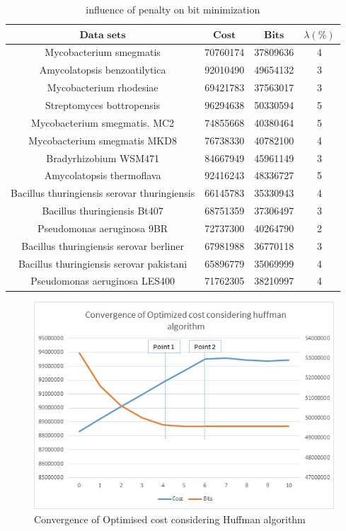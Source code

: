 \documentclass[preprint,12pt]{elsarticle}
\begin{document}
\begin{table}
\small
\label{datas}
\caption{influence of penalty on bit minimization}
\begin{center}
\begin{tabular}{c c c c }
\toprule
$\textbf{Data sets}$ & $\textbf{Cost}$	& $\textbf{Bits}$ &		\textbf{$\lambda (\%)$} \\\hline
Mycobacterium smegmatis &	 70760174 &37809636& 4\\\hline
Amycolatopsis benzoatilytica &	92010490& 49654132& 3\\\hline
Mycobacterium rhodesiae&	69421783& 37563017 &3\\\hline
Streptomyces bottropensis&	96294638& 50330594& 5\\\hline
Mycobacterium smegmatis. MC2&	74855668 &40380464& 5\\\hline
Mycobacterium smegmatis MKD8&	76738330& 40782100 &4\\\hline
Bradyrhizobium WSM471&	84667949 &45961149& 3\\\hline
Amycolatopsis thermoflava&	92416243 &48336727& 5\\\hline
Bacillus thuringiensis serovar thuringiensis&	66145783& 35330943& 4\\\hline
Bacillus thuringiensis Bt407&	68751359& 37306497 &3\\\hline
Pseudomonas aeruginosa 9BR&	72737300 &40264790& 2\\\hline
Bacillus thuringiensis serovar berliner&	67981988 &36770118 &3\\\hline
Bacillus thuringiensis serovar pakistani&	65896779& 35069999 &4\\\hline
Pseudomonas aeruginosa LES400&	71762305 &38210997 &4\\\hline
\bottomrule
\end{tabular}
\end{center}
\end{table}
\begin{figure}[h]
\begin{center}
\includegraphics{Images/Drawing4.jpg}
\caption{Convergence of Optimised cost considering Huffman algorithm}
\end{center}
\label{Fig5}
\end{figure}
\end{document}
